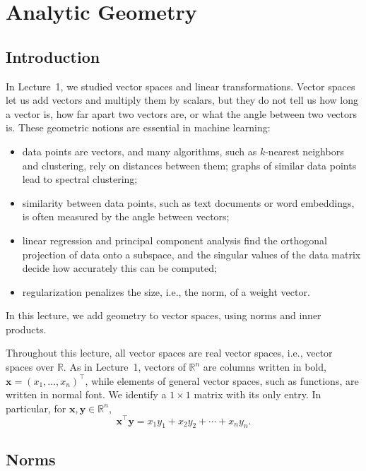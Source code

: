 \chapter{Analytic Geometry}\label{L2-chapter}
\begingroup
\section*{Introduction}

In Lecture~1, we studied vector spaces and linear transformations. Vector spaces let us add vectors and multiply them by scalars, but they do not tell us how long a vector is, how far apart two vectors are, or what the angle between two vectors is. These geometric notions are essential in machine learning:
\begin{itemize}
    \item data points are vectors, and many algorithms, such as $k$-nearest neighbors and clustering, rely on distances between them; graphs of similar data points lead to spectral clustering;
    \item similarity between data points, such as text documents or word embeddings, is often measured by the angle between vectors;
    \item linear regression and principal component analysis find the orthogonal projection of data onto a subspace, and the singular values of the data matrix decide how accurately this can be computed;
    \item regularization penalizes the size, i.e., the norm, of a weight vector.
\end{itemize}
In this lecture, we add geometry to vector spaces, using norms and inner products.

Throughout this lecture, all vector spaces are real vector spaces, i.e., vector spaces over $\mathbb{R}$. As in Lecture~1, vectors of $\mathbb{R}^n$ are columns written in bold, $\mathbf{x} = (x_1, \ldots, x_n)^\top$, while elements of general vector spaces, such as functions, are written in normal font. We identify a $1 \times 1$ matrix with its only entry. In particular, for $\mathbf{x}, \mathbf{y} \in \mathbb{R}^n$,
\[\mathbf{x}^\top \mathbf{y} = x_1 y_1 + x_2 y_2 + \cdots + x_n y_n.\]

\section{Norms}

